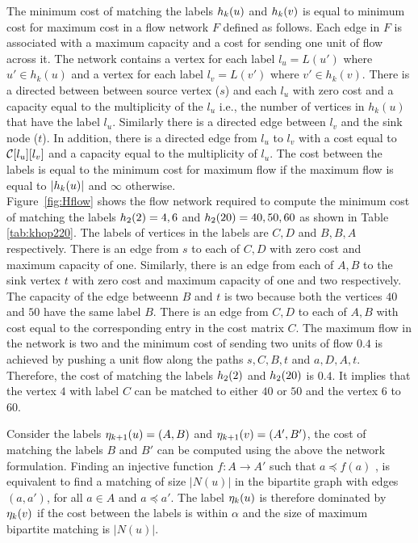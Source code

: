  The minimum cost of matching the
\khop labels $h_{k}(u)$ and $h_{k}(v)$ is equal to
minimum cost for maximum cost in a flow network $F$ defined as follows.  Each
edge in $F$ is associated with a maximum capacity and a cost for sending one
unit of flow across it.  The network contains a vertex for each label $l_u =
L(u')$ where $u' \in h_k(u)$ and a vertex for each label $l_v = L(v')$ where $v'
\in h_k(v)$. There is a directed between between source vertex ($s$) and each
$l_u$ with zero cost and a capacity equal to the multiplicity of the $l_u$
i.e., the number of vertices in $h_k(u)$ that have the label $l_u$. Similarly
there is a directed edge between $l_v$ and the sink node ($t$). In addition,
there is a directed edge from $l_u$ to $l_v$ with a cost
equal to $\mathcal{C}[l_u][l_v]$ and a capacity equal to the
multiplicity of $l_u$. The cost between the \khop labels is equal to
the minimum cost for maximum flow if the maximum flow is equal to
$|h_{k}(u)|$ and $\infty$ otherwise.
\\ Figure~\ref{fig:Hflow} shows the
flow network required to compute the minimum cost of matching the \khop labels
$h_{2}(2) = 4,6 $ and $h_{2}(20) = 40, 50, 60$ as shown in Table
\ref{tab:khop220}. The labels of vertices in the \khop labels are $C,D$ and $B,
B, A$ respectively. 
There is an edge from $s$ to each of $C, D$ with zero cost
and maximum capacity of one.  Similarly, there is an edge from each of $A, B$ to
the sink vertex $t$ with zero cost and maximum capacity of one and two
respectively. The capacity of the edge betweenn $B$ and $t$ is two because 
both the vertices $40$ and $50$ have the same label $B$.
There is an edge from $C, D$ to each of $A, B$ with cost equal to
the corresponding entry in the cost matrix $C$. The maximum flow in the network
is two and the minimum cost of sending two units of flow $0.4$ is achieved by
pushing a unit flow along the paths $s, C, B, t$ and $a, D, A, t$.  Therefore,
the cost of matching the labels $h_{2}(2)$ and $h_{2}(20)$ is $0.4$. It
implies that the vertex $4$ with label $C$ can be matched to either $40$ or $50$
and the vertex $6$ to $60$.

 Consider the 
\ncl labels $\eta_{k+1}(u) = (A, B)$ and  $\eta_{k+1}(v) = (A', B')$, the cost of 
matching the \khop labels
$B$ and $B'$ can be computed using the above the network formulation.
Finding an injective function $f\!\!:A \rightarrow A'$ such that $a \preceq
f(a)$ , is equivalent to find a matching of size $|N(u)|$ in the bipartite graph
with edges $(a, a')$, for all $a \in A$ and $a \preceq a'$.
The \ncl label $\eta_{k}(u)$ is therefore dominated by $\eta_{k}(v)$ if the
cost between the \khop labels is within $\alpha$ and the size of maximum
bipartite matching is $|N(u)|$.

